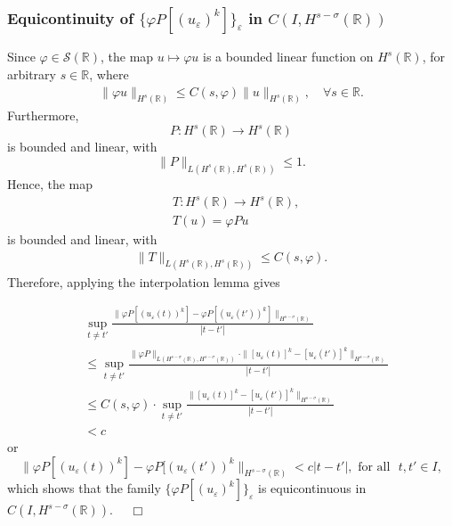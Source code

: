 \documentclass{beamer}
\newcommand{\nin}{\noindent}
\newcommand{\rr}{\mathbb{R}}
\newcommand{\ee}{\varepsilon}
\newcommand{\vp}{\varphi}
\begin{document}
		\vskip0.1in
		\nin
    \begin{frame}
		\frametitle{Equicontinuity of $\{ \varphi P [(u_\ee)^k]\}_\ee$  in $C(I,
    H^{s-\sigma}(\rr))$}
		Since $\varphi \in \mathcal{S}(\rr)$, the map $u \mapsto \vp u$
		is a bounded linear function on $H^s(\rr)$, for arbitrary $s \in
		\rr$, where  
		\begin{equation}
			\begin{split}
				\|\varphi u\|_{H^s(\rr)} \le C(s, \varphi)
				\|u\|_{H^s(\rr)}, \quad \forall s\in \rr.
				\label{hhschwartz-estimate}
			\end{split}
		\end{equation}
		Furthermore, $$P: H^s(\rr) \to H^s(\rr)$$ is bounded and linear,
		with 
		\begin{equation}
			\label{operator-normaa}
			\|P\|_{L(H^s(\rr), H^s(\rr))} \le 1.
		\end{equation}
		Hence, the map 
		\begin{equation}
			\label{the-map}
			\begin{split}
			& T: H^s(\rr) \to H^s(\rr),
			\\
			& T(u) = \vp P u 
		\end{split}
	\end{equation}
	is bounded and linear, with 
	\begin{equation}
		\begin{split}
			\|T\|_{L(H^s(\rr), H^s(\rr))} \le C(s, \vp).
			\label{op-norm-product}
		\end{split}
	\end{equation}
	Therefore, applying the interpolation lemma
		gives 
  \end{frame}
  \begin{frame}
		\begin{equation*}
			\begin{split}
			\label{hhequic-1}
			& \sup_{t \neq t'} \frac {\| \varphi P [(u_\ee(t))^k] - \varphi
			P [(u_\ee(t'))^k] \|_{H^{s -
			\sigma  }(\rr)}}{|t - t'|}
			\\
			& \le \sup_{t \neq t'}  \frac { \|\vp P \|_{L(H^{s-\sigma}(\rr),
			H^{s-\sigma}(\rr))} \cdot \|   [u_\ee(t)]^k  - 
			[u_\ee(t')]^k \|_{H^{s -
			\sigma }(\rr)}}{|t - t'|}
			\\
			& \le C(s, \vp) \cdot \sup_{t \neq t'}  \frac { \|   [u_\ee(t)]^k  - 
			[u_\ee(t')]^k \|_{H^{s -
			\sigma }(\rr)}}{|t - t'|}
			\\
			&< c
		\end{split}
		\end{equation*}
		or
		\begin{equation*}
			\label{hhequic-2}
			\|\varphi P [(u_\ee(t))^k] - \varphi
			P [(u_\ee(t'))^k \|_{H^{s - \sigma }(\rr)}< c|t -
			t'|, 
			\text{ for all }  \,\,  t, t'\in I,
		\end{equation*}
		which shows that  the family  $\{\varphi P [(u_\ee)^k]\}_\ee$ is
		equicontinuous in $C(I, H^{s-\sigma }(\rr))$.  $\quad \Box$
		\vskip0.1in
		\nin
    \end{frame}
\end{document}
